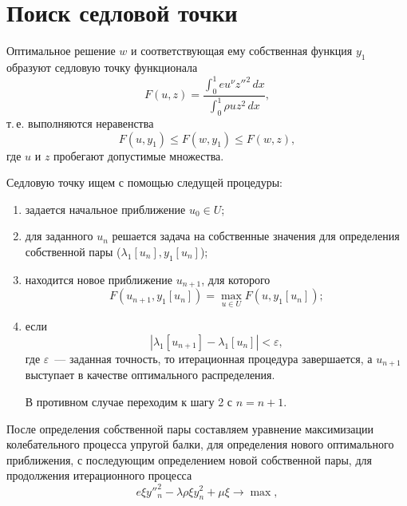 \section{Поиск седловой точки}


\par
Оптимальное решение $w$ и соответствующая ему собственная функция $y_1$ образуют седловую точку функционала 
\begin{equation}
F(u,z) = \frac{\int_{0}^{1}eu^{\nu}z''^2  \, dx}{\int_{0}^{1}\rho uz^2 \, dx},
\end{equation}
т.\,е. выполняются неравенства
\begin{equation}
F(u,y_1) \leq F(w,y_1) \leq F(w,z),
\end{equation}
где $u$ и $z$ пробегают допустимые множества.
%
\bigskip
\par
Седловую точку ищем с помощью следущей процедуры: 
%
\par 
\begin{enumerate}
	\item задается начальное приближение $u_0 \in U$;
	\item  для заданного $u_n$ решается задача на собственные значения для определения собственной пары ($\lambda_1[u_n], y_1[u_n]$);
	
	\par
	\item находится новое приближение $u_{n+1}$, для которого
	\begin{equation}
	F(u_{n+1},y_1[u_n]) = \max_{u \in U} F(u,y_1[u_n]);
	\end{equation}
	
	\item если 
	\begin{equation}
	|\lambda_1[u_{n+1}] - \lambda_1[u_{n}]| < \varepsilon,
	\end{equation}
	где $\varepsilon$~--- заданная  точность, то итерационная процедура завершается, а $u_{n+1}$ выступает в качестве оптимального распределения.
	\bigskip
	\par
	В противном случае переходим к шагу 2 с $n=n+1$.
\end{enumerate}

\bigskip
\par
После определения собственной пары составляем уравнение максимизации колебательного процесса упругой балки, для определения нового оптимального приближения, с последующим определением новой собственной пары, для продолжения итерационного процесса
\begin{equation}
\label{MaximizingVibrating} 
e\xi y''^2_n - \lambda\rho\xi y^2_n + \mu\xi \rightarrow \max,
\end{equation}

